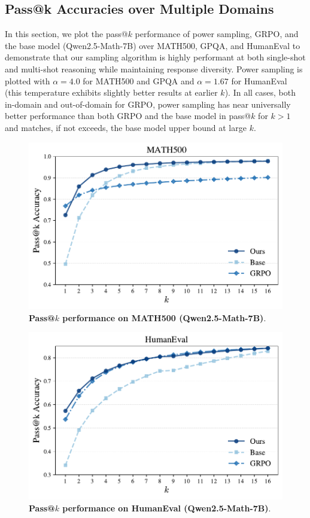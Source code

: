 \documentclass{article}
\begin{document}
\subsection{Pass@k Accuracies over Multiple Domains}\label{apx:passes}
In this section, we plot the pass@$k$ performance of power sampling, GRPO, and the base model (Qwen2.5-Math-7B) over MATH500, GPQA, and HumanEval to demonstrate that our sampling algorithm is highly performant at both single-shot and multi-shot reasoning while maintaining response diversity. Power sampling is plotted with $\alpha = 4.0$ for MATH500 and GPQA and $\alpha = 1.67$ for HumanEval (this temperature exhibits slightly better results at earlier $k$). In all cases, both in-domain and out-of-domain for GRPO, power sampling has near universally better performance than both GRPO and the base model in pass@$k$ for $k > 1$ and matches, if not exceeds, the base model upper bound at large $k$. 
\begin{figure}[h!]
    \centering
    \includegraphics[width=0.9\linewidth]{math500_passatk_comparison.pdf}
    \captionsetup{font=small}
    \caption{\textbf{Pass@$k$ performance on MATH500 (Qwen2.5-Math-7B)}. }
    \label{fig:apxpass}
\end{figure}

\begin{figure}[h!]
    \centering
    \includegraphics[width=0.9\linewidth]{passatk_comparison_he_alt.pdf}
    \captionsetup{font=small}
    \caption{\textbf{Pass@$k$ performance on HumanEval (Qwen2.5-Math-7B)}. }
    \label{fig:apxpass3}
\end{figure}
\end{document}
